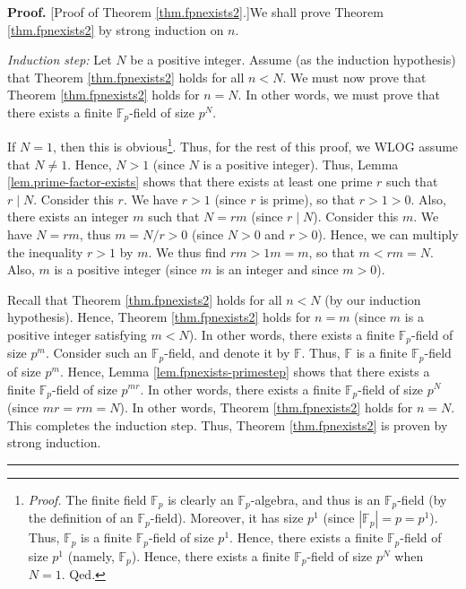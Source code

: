 \documentclass[numbers=enddot,12pt,final,onecolumn,notitlepage]{scrartcl}%
\theoremstyle{definition}
\newenvironment{proof}[1][Proof]{\noindent\textbf{#1.} }{\ \rule{0.5em}{0.5em}}
\begin{document}
\begin{proof}
[Proof of Theorem \ref{thm.fpnexists2}.]We shall prove Theorem
\ref{thm.fpnexists2} by strong induction on $n$.

\textit{Induction step:} Let $N$ be a positive integer. Assume (as the
induction hypothesis) that Theorem \ref{thm.fpnexists2} holds for all $n<N$.
We must now prove that Theorem \ref{thm.fpnexists2} holds for $n=N$. In other
words, we must prove that there exists a finite $\mathbb{F}_{p}$-field of size
$p^{N}$.

If $N=1$, then this is obvious\footnote{\textit{Proof.} The finite field
$\mathbb{F}_{p}$ is clearly an $\mathbb{F}_{p}$-algebra, and thus is an
$\mathbb{F}_{p}$-field (by the definition of an $\mathbb{F}_{p}$-field).
Moreover, it has size $p^{1}$ (since $\left\vert \mathbb{F}_{p}\right\vert
=p=p^{1}$). Thus, $\mathbb{F}_{p}$ is a finite $\mathbb{F}_{p}$-field of size
$p^{1}$. Hence, there exists a finite $\mathbb{F}_{p}$-field of size $p^{1}$
(namely, $\mathbb{F}_{p}$). Hence, there exists a finite $\mathbb{F}_{p}%
$-field of size $p^{N}$ when $N=1$. Qed.}. Thus, for the rest of this proof,
we WLOG assume that $N\neq1$. Hence, $N>1$ (since $N$ is a positive integer).
Thus, Lemma \ref{lem.prime-factor-exists} shows that there exists at least one
prime $r$ such that $r\mid N$. Consider this $r$. We have $r>1$ (since $r$ is
prime), so that $r>1>0$. Also, there exists an integer $m$ such that $N=rm$
(since $r\mid N$). Consider this $m$. We have $N=rm$, thus $m=N/r>0$ (since
$N>0$ and $r>0$). Hence, we can multiply the inequality $r>1$ by $m$. We thus
find $rm>1m=m$, so that $m<rm=N$. Also, $m$ is a positive integer (since $m$
is an integer and since $m>0$).

Recall that Theorem \ref{thm.fpnexists2} holds for all $n<N$ (by our induction
hypothesis). Hence, Theorem \ref{thm.fpnexists2} holds for $n=m$ (since $m$ is
a positive integer satisfying $m<N$). In other words, there exists a finite
$\mathbb{F}_{p}$-field of size $p^{m}$. Consider such an $\mathbb{F}_{p}%
$-field, and denote it by $\mathbb{F}$. Thus, $\mathbb{F}$ is a finite
$\mathbb{F}_{p}$-field of size $p^{m}$. Hence, Lemma
\ref{lem.fpnexists-primestep} shows that there exists a finite $\mathbb{F}%
_{p}$-field of size $p^{mr}$. In other words, there exists a finite
$\mathbb{F}_{p}$-field of size $p^{N}$ (since $mr=rm=N$). In other words,
Theorem \ref{thm.fpnexists2} holds for $n=N$. This completes the induction
step. Thus, Theorem \ref{thm.fpnexists2} is proven by strong induction.
\end{proof}
\end{document}
